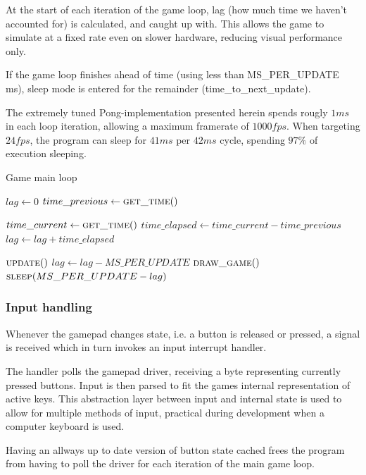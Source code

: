 At the start of each iteration of the game loop, lag (how much time we haven't
accounted for) is calculated, and caught up with.
This allows the game to simulate at a fixed rate even on slower hardware,
reducing visual performance only.

If the game loop finishes ahead of time (using less than MS\_PER\_UPDATE ms),
sleep mode is entered for the remainder (time\_to\_next\_update).

The extremely tuned Pong-implementation presented herein spends rougly $ 1 ms $
in each loop iteration, allowing a maximum framerate of $ 1000 fps $.
When targeting $ 24 fps $, the program can sleep for $ 41 ms $ per $ 42 ms $ cycle,
spending $ 97 \% $ of execution sleeping.

\begin{algorithm}
  \caption{Game main loop}
  \begin{algorithmic}
    \State $lag \gets 0$
    \State $time\_previous \gets \Call{get\_time}{\null}$

    \Loop
      \State $time\_current \gets \Call{get\_time}{\null}$
      \State $time\_elapsed \gets time\_current - time\_previous$
      \State $lag \gets lag + time\_elapsed$

        \State $\Call{update}{\null}$
        \State $lag \gets lag - MS\_PER\_UPDATE$
      \EndWhile
      \State $\Call{draw\_game}{\null}$
      \State $\Call{sleep}{MS\_PER\_UPDATE - lag}$
    \EndLoop
  \end{algorithmic}
\end{algorithm}

\subsubsection{Input handling}
Whenever the gamepad changes state, i.e. a button is released or pressed,
a signal is received which in turn invokes an input interrupt handler.

The handler polls the gamepad driver, receiving a byte representing currently
pressed buttons. Input is then parsed to fit the games internal representation
of active keys. This abstraction layer between input and internal state is used
to allow for multiple methods of input, practical during development when a
computer keyboard is used.

Having an allways up to date version of button state cached frees the program
from having to poll the driver for each iteration of the main game loop.


